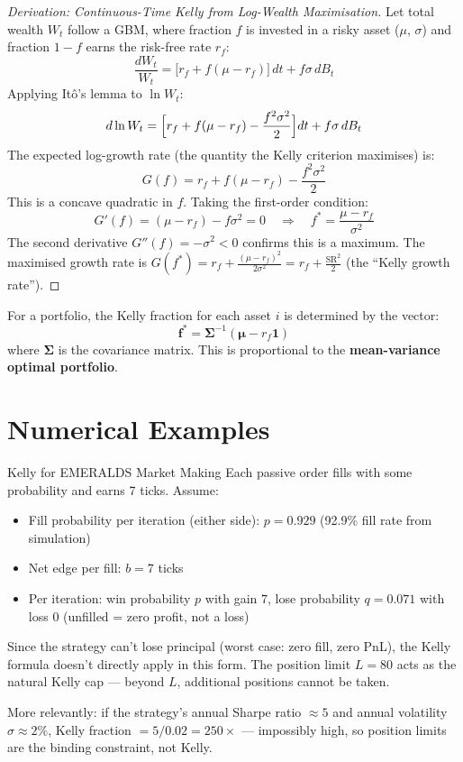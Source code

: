 \documentclass[12pt,a4paper,openany]{report}
\theoremstyle{definition}
\begin{document}
\begin{proof}[Derivation: Continuous-Time Kelly from Log-Wealth Maximisation]
Let total wealth $W_t$ follow a GBM, where fraction $f$ is invested in a risky asset ($\mu$, $\sigma$) and fraction $1-f$ earns the risk-free rate $r_f$:
\[
  \frac{dW_t}{W_t} = \bigl[r_f + f(\mu - r_f)\bigr]\,dt + f\sigma\,dB_t
\]
Applying Itô's lemma to $\ln W_t$:
\[
  d\ln W_t = \Bigl[r_f + f(\mu - r_f) - \frac{f^2\sigma^2}{2}\Bigr]dt + f\sigma\,dB_t
\]
The expected log-growth rate (the quantity the Kelly criterion maximises) is:
\[
  G(f) = r_f + f(\mu - r_f) - \frac{f^2\sigma^2}{2}
\]
This is a concave quadratic in $f$. Taking the first-order condition:
\[
  G'(f) = (\mu - r_f) - f\sigma^2 = 0 \quad\Rightarrow\quad f^* = \frac{\mu - r_f}{\sigma^2}
\]
The second derivative $G''(f) = -\sigma^2 < 0$ confirms this is a maximum.
The maximised growth rate is $G(f^*) = r_f + \frac{(\mu-r_f)^2}{2\sigma^2} = r_f + \frac{\text{SR}^2}{2}$ (the ``Kelly growth rate'').
\end{proof}

For a portfolio, the Kelly fraction for each asset $i$ is determined by the vector:
\begin{equation}
  \mathbf{f}^* = \boldsymbol{\Sigma}^{-1}(\boldsymbol{\mu} - r_f \mathbf{1})
\end{equation}
where $\boldsymbol{\Sigma}$ is the covariance matrix. This is proportional to the \textbf{mean-variance optimal portfolio}.

\section{Numerical Examples}

\begin{examplebox}{Kelly for EMERALDS Market Making}
Each passive order fills with some probability and earns 7 ticks. Assume:
\begin{itemize}
  \item Fill probability per iteration (either side): $p = 0.929$ (92.9\% fill rate from simulation)
  \item Net edge per fill: $b = 7$ ticks
  \item Per iteration: win probability $p$ with gain $7$, lose probability $q = 0.071$ with loss $0$ (unfilled = zero profit, not a loss)
\end{itemize}
Since the strategy can't lose principal (worst case: zero fill, zero PnL), the Kelly formula doesn't directly apply in this form. The position limit $L = 80$ acts as the natural Kelly cap — beyond $L$, additional positions cannot be taken.

More relevantly: if the strategy's annual Sharpe ratio $\approx 5$ and annual volatility $\sigma \approx 2\%$, Kelly fraction $= 5/0.02 = 250\times$ — impossibly high, so position limits are the binding constraint, not Kelly.
\end{examplebox}
\end{document}

